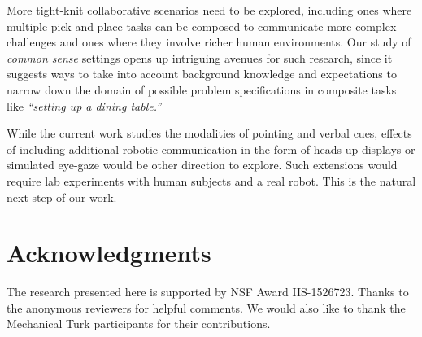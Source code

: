 
More tight-knit collaborative scenarios need to be explored, including ones where multiple pick-and-place tasks can be composed to communicate more complex challenges and ones where they involve richer human environments.  Our study of  \textit{common sense} settings opens up intriguing avenues for such research, since it suggests ways to take into account background knowledge and expectations to narrow down the domain of possible problem specifications in composite tasks like \textit{``setting up a dining table.''} 

While the current work studies the modalities of pointing and verbal cues, effects of including additional robotic communication in the form of heads-up displays or simulated eye-gaze would be other direction to explore. Such extensions would require lab experiments with human subjects and a real robot.  This is the natural next step of our work. 




\section{Acknowledgments}
The research presented here is supported by NSF
Award IIS-1526723.
Thanks to the anonymous reviewers for helpful comments. We would also like to thank the Mechanical Turk participants for their contributions.